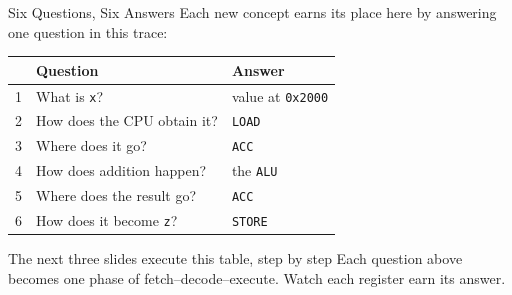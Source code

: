 \documentclass[9pt,aspectratio=169,xcolor=table]{beamer}
\begin{document}
\begin{frame}{Six Questions, Six Answers}
    \leavevmode
    Each new concept earns its place here by answering one question
    in this trace:

    \vspace{3mm}
    \begin{center}
    {\small
    \begin{tabular}{@{}c l l@{}}
        \toprule
        & \textbf{Question} & \textbf{Answer} \\
        \midrule
        1 & What is \texttt{x}? & value at \texttt{0x2000} \\
        2 & How does the CPU obtain it? & \texttt{LOAD} \\
        3 & Where does it go? & \texttt{ACC} \\
        4 & How does addition happen? & the \texttt{ALU} \\
        5 & Where does the result go? & \texttt{ACC} \\
        6 & How does it become \texttt{z}? & \texttt{STORE} \\
        \bottomrule
    \end{tabular}}
    \end{center}

    \vspace{3mm}
    \begin{block}{The next three slides execute this table, step by step}
        Each question above becomes one phase of
        fetch--decode--execute. \alert{Watch each register earn its
        answer.}
    \end{block}
\end{frame}
\end{document}
